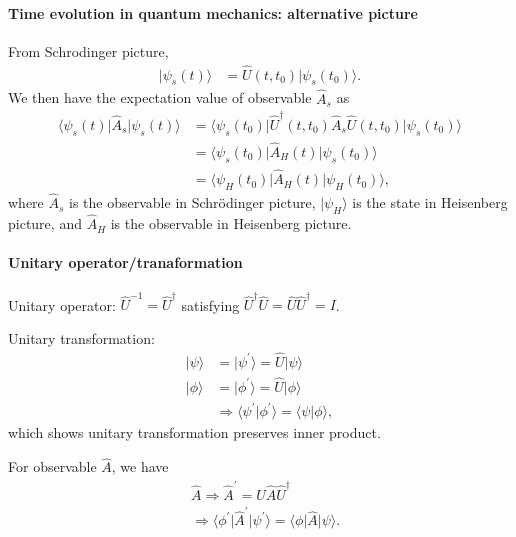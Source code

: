 \documentclass[../../note.tex]{subfiles}
\begin{document}
\paragraph{Time evolution in quantum mechanics: alternative picture}
From Schrodinger picture,
\begin{align}
    \vert \psi_s(t) \rangle 
    &= \hat{U}(t, t_0) \vert \psi_s(t_0) \rangle.
\end{align}
We then have the expectation value of observable $\hat{A}_s$ as
\begin{align}
    \langle \psi_s(t) \vert \hat{A}_s \vert \psi_s(t) \rangle
    &= \langle \psi_s(t_0) \vert \hat{U}^\dagger(t,t_0) \hat{A}_s \hat{U}(t,t_0) \vert \psi_s(t_0) \rangle \\
    &= \langle \psi_s(t_0) \vert \hat{A}_H(t) \vert \psi_s(t_0) \rangle \\
    &= \langle \psi_H(t_0) \vert \hat{A}_H(t) \vert \psi_H(t_0) \rangle,
\end{align}
where $\hat{A}_s$ is the observable in Schrödinger picture, $\vert \psi_H \rangle$ is the state in Heisenberg picture, and $\hat{A}_H$ is the observable in Heisenberg picture.

\paragraph{Unitary operator/tranaformation}
Unitary operator: $\hat{U}^{-1} = \hat{U}^\dagger$ satisfying $\hat{U}^\dagger \hat{U} = \hat{U} \hat{U}^\dagger = I$.

Unitary transformation: 
\begin{align}
    \vert \psi \rangle
    &= \vert \psi^\prime \rangle = \hat{U} \vert \psi \rangle \\
    \vert \phi \rangle
    &= \vert \phi^\prime \rangle = \hat{U} \vert \phi \rangle \\
    &\Longrightarrow \langle \psi^\prime \vert \phi^\prime \rangle = \langle \psi \vert \phi \rangle,
\end{align}
which shows unitary transformation preserves inner product.

For observable $\hat{A}$, we have
\begin{align}
    &\hat{A} \Longrightarrow \hat{A}^\prime = \hat{U} \hat{A} \hat{U}^\dagger \\
    &\Longrightarrow \langle \phi^\prime \vert \hat{A}^\prime \vert \psi^\prime \rangle = \langle \phi \vert \hat{A} \vert \psi \rangle.
\end{align}
\end{document}
